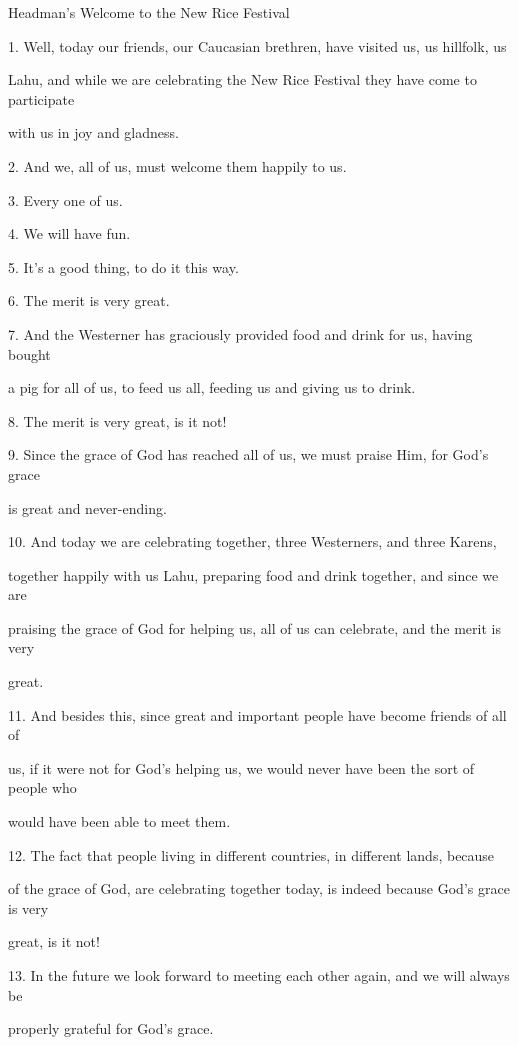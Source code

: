 
\begin{center}
Headman's Welcome to the New Rice Festival
\end{center}

\leftskip=0pt
1. Well, today our friends, our Caucasian brethren, have visited us, us hillfolk,
us

Lahu, and while we are celebrating the New Rice Festival they have come to participate

with us in joy and gladness.

2. And we, all of us, must welcome them happily to us.

3. Every one of us.

4. We will have fun.

5. It's a good thing, to do it this way.

6. The merit is very great.

7. And the Westerner has graciously provided food and drink for us, having bought

a pig for all of us, to feed us all, feeding us and giving us to drink.

8. The merit is very great, is it not!

9. Since the grace of God has reached all of us, we must praise Him, for God's
grace

is great and never-ending.

10. And today we are celebrating together, three Westerners, and three Karens,

together happily with us Lahu, preparing food and drink together, and since we
are

praising the grace of God for helping us, all of us can celebrate, and the merit
is very

great.

11. And besides this, since great and important people have become friends of all
of

us, if it were not for God's helping us, we would never have been the sort of people
who

would have been able to meet them.

12. The fact that people living in different countries, in different lands, because

of the grace of God, are celebrating together today, is indeed because God's grace
is very

great, is it not!

13. In the future we look forward to meeting each other again, and we will always
be

properly grateful for God's grace.


